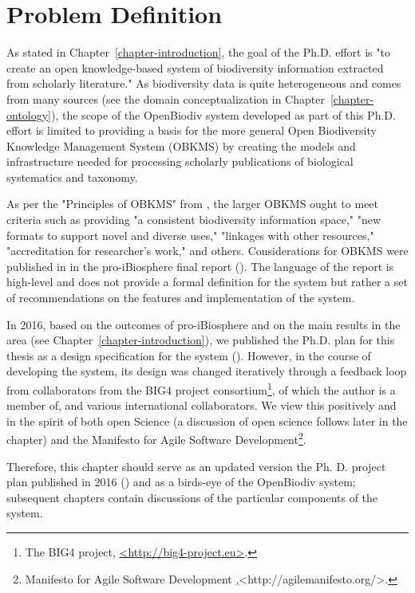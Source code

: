\chapter{Problem Definition}
\label{chapter-problem-defintion}

As stated in Chapter~\ref{chapter-introduction}, the goal of the Ph.D. effort is "to create an open knowledge-based system of biodiversity information extracted from scholarly literature." As biodiversity data is quite heterogeneous and comes from many sources (see the domain conceptualization in Chapter~\ref{chapter-ontology}), the scope of the OpenBiodiv system developed as part of this Ph.D. effort is limited to providing a basis for the more general Open Biodiversity Knowledge Management System (OBKMS) by creating the models and infrastructure needed for processing scholarly publications of biological systematics and taxonomy. 

As per the "Principles of OBKMS" from \cite{pro-ibiosphere_open_2014}, the larger OBKMS ought to meet criteria such as providing "a consistent biodiversity information space," "new formats to support novel and diverse uses," "linkages with other resources," "accreditation for researcher's work," and others. Considerations for OBKMS were published in in the pro-iBiosphere final report (\cite{soraya_sierra_coordination_2014}). The language of the report is high-level and does not provide a formal definition for the system but rather a set of recommendations on the features and implementation of the system.

In 2016, based on the outcomes of pro-iBiosphere and on the main results in the area (see Chapter~\ref{chapter-introduction}), we published the Ph.D. plan for this thesis as a design specification for the system (\cite{senderov_open_2016}). However, in the course of developing the system, its design was changed iteratively through a feedback loop from collaborators from the BIG4 project consortium\footnote{The BIG4 project, \href{http://big4-project.eu}{<http://big4-project.eu>}.}, of which the author is a member of, and various international collaborators. We view this positively and in the spirit of both open Science (a discussion of open science follows later in the chapter) and the Manifesto for Agile Software Development\footnote{Manifesto for Agile Software Development \href{http://agilemanifesto.org/},{<http://agilemanifesto.org/>}.}.

Therefore, this chapter should serve as an updated version the Ph. D. project plan published in 2016 (\cite{senderov_open_2016}) and as a birds-eye of the OpenBiodiv system; subsequent chapters contain discussions of the particular components of the system.

